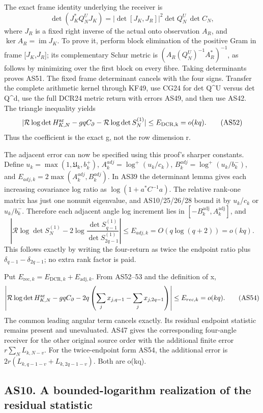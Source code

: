 \documentclass[11pt]{article}
\begin{document}
The exact frame identity underlying the receiver is \[
\det(J_K^*Q_N^UJ_K)=|\det[J_K,J_R]|^2
\det Q_N^U\,\det C_N,
\tag{AS51}
\] where \(J_R\) is a fixed right inverse of the actual onto observation \(A_R\), and \(\ker A_R=\operatorname{im}J_K\). To prove it, perform block elimination of the positive Gram in frame {[}\(J_K\),\(J_R\){]}; its complementary Schur metric is \((A_R(Q_N^U)^{-1}A_R^*)^{-1}\), as follows by minimizing over the first block on every fibre. Taking determinants proves AS51. The fixed frame determinant cancels with the four signs. Transfer the complete arithmetic kernel through KF49, use CG24 for det Q\^{}U versus det Q\^{}d, use the full DCR24 metric return with errors AS49, and then use AS42. The triangle inequality yields \[
|\mathcal R\log\det H_{K,N}^{\rm ar}-gqC_\partial-
\mathcal R\log\det S_N^{(1)}|\le E_{\rm DCR,k}=o(kq).
\tag{AS52}
\] Thus the coefficient is the exact g, not the row dimension r.

The adjacent error can now be specified using this proof's sharper constants. Define \(u_k=\max(1,\mathfrak U_k,b_k^+)\), \(A_k^{adj}=\log^+(u_k/c_k)\), \(B_k^{adj}=\log^+(u_k/b_k^-)\), and \(E_{adj,k}=2\max(A_k^{adj},B_k^{adj})\). In AS39 the determinant lemma gives each increasing covariance log ratio as \(\log(1+a^*C^{-1}a)\). The relative rank-one matrix has just one nonunit eigenvalue, and AS10/25/26/28 bound it by \(u_k\)/\(c_k\) or \(u_k/b_k^-\). Therefore each adjacent angle log increment lies in \([-B_k^{\mathrm{adj}},A_k^{\mathrm{adj}}]\), and \[
\left|\mathcal R\log\det S_N^{(1)}
-2\log\frac{\det S_{q-1}^{(1)}}{\det S_{2q-1}^{(1)}}\right|
\le E_{adj,k}=O(q\log(q+2))=o(kq).
\tag{AS53}
\] This follows exactly by writing the four-return as twice the endpoint ratio plus \(\delta_{q-1}-\delta_{2q-1}\); no extra rank factor is paid.

Put \(E_{\mathrm{rec},k}=E_{\mathrm{DCR},k}+E_{\mathrm{adj},k}\). From AS52--53 and the definition of x, \[
\left|\mathcal R\log\det H_{K,N}^{\rm ar}-gqC_\partial
-2q\left(\sum_jx_{j,q-1}-\sum_jx_{j,2q-1}\right)\right|
\le E_{rec,k}=o(kq).
\tag{AS54}
\] The common leading angular term cancels exactly. Its residual endpoint statistic remains present and unevaluated. AS47 gives the corresponding four-angle receiver for the other original source order with the additional finite error \(r\sum_N L_{k,N-v}\). For the twice-endpoint form AS54, the additional error is \(2r(L_{k,q-1-v}+L_{k,2q-1-v})\). Both are o(kq).

\subsection{AS10. A bounded-logarithm realization of the residual statistic}\label{as10.-a-bounded-logarithm-realization-of-the-residual-statistic}
\end{document}

